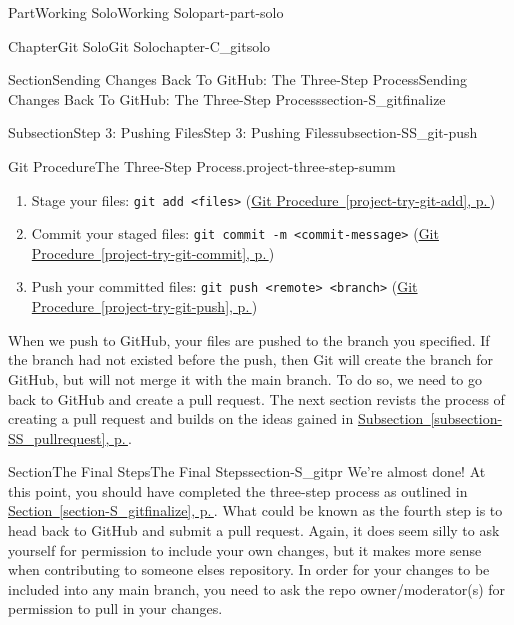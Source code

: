 \documentclass[twoside,10pt,]{book}
\newcommand{\xreffont}{\relax}
\newcommand{\mono}[1]{\texttt{#1}}
\begin{document}
\begin{partptx}{Part}{Working Solo}{}{Working Solo}{}{}{part-part-solo}
\begin{chapterptx}{Chapter}{Git Solo}{}{Git Solo}{}{}{chapter-C_gitsolo}
\begin{sectionptx}{Section}{Sending Changes Back To GitHub: The Three-Step Process}{}{Sending Changes Back To GitHub: The Three-Step Process}{}{}{section-S_gitfinalize}
\begin{subsectionptx}{Subsection}{Step 3: Pushing Files}{}{Step 3: Pushing Files}{}{}{subsection-SS_git-push}
\begin{project}{Git Procedure}{The Three-Step Process.}{project-three-step-summ}
\begin{enumerate}
\item{}Stage your files: \mono{git add <files>} (\hyperref[project-try-git-add]{Git Procedure~{\xreffont\ref{project-try-git-add}}, p.\,\pageref{project-try-git-add}})%
\item{}Commit your staged files: \mono{git commit -m \textquotedbl{}<commit-message>\textquotedbl{}} (\hyperref[project-try-git-commit]{Git Procedure~{\xreffont\ref{project-try-git-commit}}, p.\,\pageref{project-try-git-commit}})%
\item{}Push your committed files: \mono{git push <remote> <branch>} (\hyperref[project-try-git-push]{Git Procedure~{\xreffont\ref{project-try-git-push}}, p.\,\pageref{project-try-git-push}})%
\end{enumerate}
%
\end{project}%
\end{subsectionptx}
\begin{conclusion}{}%
When we push to GitHub, your files are pushed to the branch you specified. If the branch had not existed before the push, then Git will create the branch for GitHub, but will not merge it with the main branch. To do so, we need to go back to GitHub and create a pull request. The next section revists the process of creating a pull request and builds on the ideas gained in \hyperref[subsection-SS_pullrequest]{Subsection~{\xreffont\ref{subsection-SS_pullrequest}}, p.\,\pageref{subsection-SS_pullrequest}}.%
\end{conclusion}%
\end{sectionptx}
%
%
\typeout{************************************************}
\typeout{************************************************}
%
\begin{sectionptx}{Section}{The Final Steps}{}{The Final Steps}{}{}{section-S_gitpr}
%
%
%
We're almost done! At this point, you should have completed the three-step process as outlined in \hyperref[section-S_gitfinalize]{Section~{\xreffont\ref{section-S_gitfinalize}}, p.\,\pageref{section-S_gitfinalize}}. What could be known as the fourth step is to head back to GitHub and submit a pull request. Again, it does seem silly to ask yourself for permission to include your own changes, but it makes more sense when contributing to someone elses repository. In order for your changes to be included into any main branch, you need to ask the repo owner\slash{}moderator(s) for permission to pull in your changes.%
\par

\end{sectionptx}
\end{chapterptx}
\end{partptx}
\end{document}
